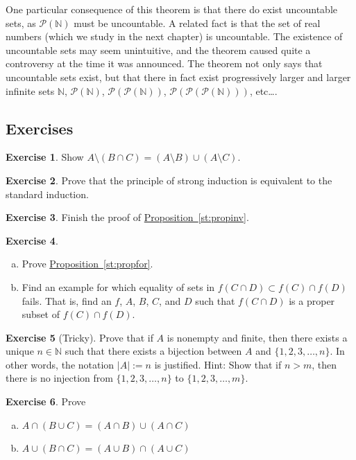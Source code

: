 \documentclass[12pt]{book}
\newcommand{\abs}[1]{\left\lvert {#1} \right\rvert}
\newcommand{\N}{{\mathbb{N}}}
\newcommand{\sP}{{\mathcal{P}}}
\theoremstyle{plain}
\theoremstyle{remark}
\theoremstyle{definition}
\theoremstyle{exercise}
\newtheorem{exercise}{Exercise}[section]
\theoremstyle{example}
\newcommand{\propref}[1]{\hyperref[#1]{Proposition~\ref*{#1}}}
\begin{document}
One particular consequence of this 
theorem is that there do exist uncountable sets,
as $\sP(\N)$ must be uncountable.
A related fact is that
the set of real numbers (which we study in the next chapter) is uncountable.
The existence of uncountable sets may seem unintuitive, and the theorem
caused quite a controversy at the time
it was announced.  The theorem not only says that uncountable sets exist,
but that there in fact exist progressively larger
and larger infinite sets $\N$, $\sP(\N)$,
$\sP(\sP(\N))$, $\sP(\sP(\sP(\N)))$, etc\ldots.

\subsection{Exercises}

\begin{exercise}
Show
$A \setminus (B \cap C) = (A \setminus B) \cup (A \setminus C)$.
\end{exercise}

\begin{exercise}
Prove that the principle of strong induction is equivalent to the standard
induction.
\end{exercise}

\begin{exercise}
Finish the proof of \propref{st:propinv}.
\end{exercise}

\begin{exercise}
\begin{enumerate}[a)]
\item
Prove \propref{st:propfor}.
\item
Find an example for which equality of sets
in 
$f( C \cap D) \subset f (C) \cap f (D)$
fails.  That is, find an $f$, $A$, $B$, $C$, and $D$ such that
$f( C \cap D)$ is a proper subset of $f(C) \cap f(D)$.
\end{enumerate}
\end{exercise}

\begin{exercise}[Tricky]
Prove that if $A$ is nonempty and finite, then there exists a unique
$n \in \N$ such
that there exists a bijection between $A$ and $\{ 1, 2, 3, \ldots, n \}$.
In other words, the notation $\abs{A} := n$ is justified.
Hint: Show that if $n > m$, then there is no injection from
$\{ 1, 2, 3, \ldots, n \}$ to
$\{ 1, 2, 3, \ldots, m \}$.
\end{exercise}


\begin{exercise}
Prove
\begin{enumerate}[a)]
\item $A \cap (B \cup C) = (A \cap B) \cup (A \cap C)$
\item $A \cup (B \cap C) = (A \cup B) \cap (A \cup C)$
\end{enumerate}
\end{exercise}
\end{document}
